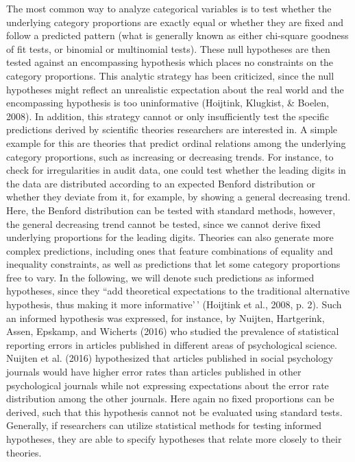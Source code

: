 \documentclass[
  english,
  man,floatsintext]{apa6}
\begin{document}
The most common way to analyze categorical variables is to test whether the underlying category proportions are exactly equal or whether they are fixed and follow a predicted pattern (what is generally known as either chi-square goodness of fit tests, or binomial or multinomial tests). These null hypotheses are then tested against an encompassing hypothesis which places no constraints on the category proportions. This analytic strategy has been criticized, since the null hypotheses might reflect an unrealistic expectation about the real world and the encompassing hypothesis is too uninformative (Hoijtink, Klugkist, \& Boelen, 2008). In addition, this strategy cannot or only insufficiently test the specific predictions derived by scientific theories researchers are interested in. A simple example for this are theories that predict ordinal relations among the underlying category proportions, such as increasing or decreasing trends. For instance, to check for irregularities in audit data, one could test whether the leading digits in the data are distributed according to an expected Benford distribution or whether they deviate from it, for example, by showing a general decreasing trend. Here, the Benford distribution can be tested with standard methods, however, the general decreasing trend cannot be tested, since we cannot derive fixed underlying proportions for the leading digits. Theories can also generate more complex predictions, including ones that feature combinations of equality and inequality constraints, as well as predictions that let some category proportions free to vary. In the following, we will denote such predictions as informed hypotheses, since they ``add theoretical expectations to the traditional alternative hypothesis, thus making it more informative'\,' (Hoijtink et al., 2008, p. 2). Such an informed hypothesis was expressed, for instance, by Nuijten, Hartgerink, Assen, Epskamp, and Wicherts (2016) who studied the prevalence of statistical reporting errors in articles published in different areas of psychological science. Nuijten et al. (2016) hypothesized that articles published in social psychology journals would have higher error rates than articles published in other psychological journals while not expressing expectations about the error rate distribution among the other journals. Here again no fixed proportions can be derived, such that this hypothesis cannot not be evaluated using standard tests. Generally, if researchers can utilize statistical methods for testing informed hypotheses, they are able to specify hypotheses that relate more closely to their theories.
\end{document}
